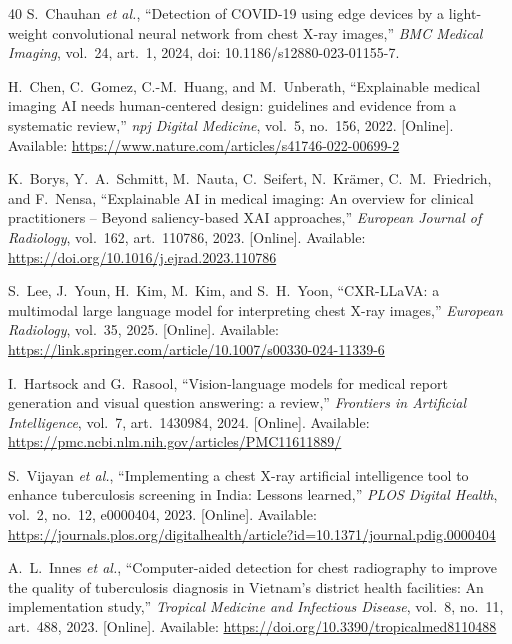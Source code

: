 \documentclass[conference, letterpaper]{IEEEtran}
\begin{document}
\begin{thebibliography}{40}
S.~Chauhan \textit{et al.}, ``Detection of COVID-19 using edge devices by a light-weight convolutional neural network from chest X-ray images,'' \textit{BMC Medical Imaging}, vol.~24, art.~1, 2024, doi: 10.1186/s12880-023-01155-7.


H.~Chen, C.~Gomez, C.-M.~Huang, and M.~Unberath, ``Explainable medical imaging AI needs human-centered design: guidelines and evidence from a systematic review,'' \textit{npj Digital Medicine}, vol.~5, no.~156, 2022. [Online]. Available: \url{https://www.nature.com/articles/s41746-022-00699-2}

K.~Borys, Y.~A.~Schmitt, M.~Nauta, C.~Seifert, N.~Kr\"{a}mer, C.~M.~Friedrich, and F.~Nensa, ``Explainable AI in medical imaging: An overview for clinical practitioners -- Beyond saliency-based XAI approaches,'' \textit{European Journal of Radiology}, vol.~162, art.~110786, 2023. [Online]. Available: \url{https://doi.org/10.1016/j.ejrad.2023.110786}

S.~Lee, J.~Youn, H.~Kim, M.~Kim, and S.~H.~Yoon, ``CXR-LLaVA: a multimodal large language model for interpreting chest X-ray images,'' \textit{European Radiology}, vol.~35, 2025. [Online]. Available: \url{https://link.springer.com/article/10.1007/s00330-024-11339-6}

I.~Hartsock and G.~Rasool, ``Vision-language models for medical report generation and visual question answering: a review,'' \textit{Frontiers in Artificial Intelligence}, vol.~7, art.~1430984, 2024. [Online]. Available: \url{https://pmc.ncbi.nlm.nih.gov/articles/PMC11611889/}

S.~Vijayan \textit{et al.}, ``Implementing a chest X-ray artificial intelligence tool to enhance tuberculosis screening in India: Lessons learned,'' \textit{PLOS Digital Health}, vol.~2, no.~12, e0000404, 2023. [Online]. Available: \url{https://journals.plos.org/digitalhealth/article?id=10.1371/journal.pdig.0000404}

A.~L.~Innes \textit{et al.}, ``Computer-aided detection for chest radiography to improve the quality of tuberculosis diagnosis in Vietnam's district health facilities: An implementation study,'' \textit{Tropical Medicine and Infectious Disease}, vol.~8, no.~11, art.~488, 2023. [Online]. Available: \url{https://doi.org/10.3390/tropicalmed8110488}


\end{thebibliography}
\end{document}
